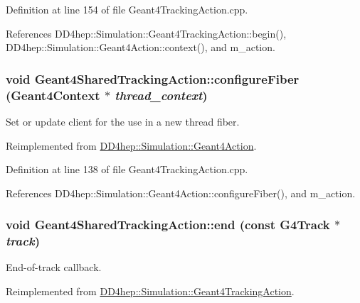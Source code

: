 Definition at line 154 of file Geant4TrackingAction.cpp.

References DD4hep::Simulation::Geant4TrackingAction::begin(), DD4hep::Simulation::Geant4Action::context(), and m\_\-action.\hypertarget{class_d_d4hep_1_1_simulation_1_1_geant4_shared_tracking_action_a7033aa446a1fbce97cf260caaf55b5b2}{
\subsubsection[{configureFiber}]{\setlength{\rightskip}{0pt plus 5cm}void Geant4SharedTrackingAction::configureFiber ({\bf Geant4Context} $\ast$ {\em thread\_\-context})}}
\label{class_d_d4hep_1_1_simulation_1_1_geant4_shared_tracking_action_a7033aa446a1fbce97cf260caaf55b5b2}


Set or update client for the use in a new thread fiber. 

Reimplemented from \hyperlink{class_d_d4hep_1_1_simulation_1_1_geant4_action_a6adc7138508303e4e417cb48a737ab19}{DD4hep::Simulation::Geant4Action}.

Definition at line 138 of file Geant4TrackingAction.cpp.

References DD4hep::Simulation::Geant4Action::configureFiber(), and m\_\-action.\hypertarget{class_d_d4hep_1_1_simulation_1_1_geant4_shared_tracking_action_a35f435a97bbe15def248f21f37847a12}{
\subsubsection[{end}]{\setlength{\rightskip}{0pt plus 5cm}void Geant4SharedTrackingAction::end (const G4Track $\ast$ {\em track})}}
\label{class_d_d4hep_1_1_simulation_1_1_geant4_shared_tracking_action_a35f435a97bbe15def248f21f37847a12}


End-\/of-\/track callback. 

Reimplemented from \hyperlink{class_d_d4hep_1_1_simulation_1_1_geant4_tracking_action_a29f980c180576781771ea325b4a73f14}{DD4hep::Simulation::Geant4TrackingAction}.

